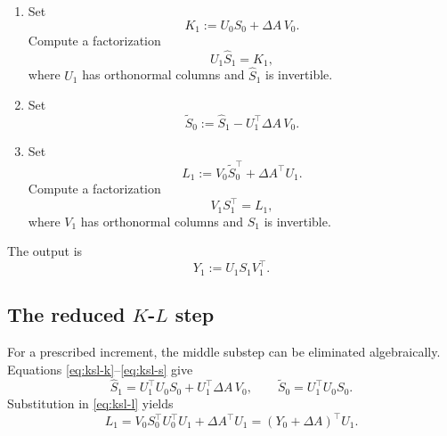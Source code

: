 \documentclass[]{article}
\numberwithin{equation}{section}
\theoremstyle{plain}
\theoremstyle{remark}
\numberwithin{algorithm}{section}
\begin{document}
\begin{enumerate}
\item Set
\begin{equation}\label{eq:ksl-k}
 K_1:=U_0S_0+\Delta A\,V_0.
\end{equation}
Compute a factorization
\begin{equation}\label{eq:ksl-k-factor}
 U_1\widehat S_1=K_1,
\end{equation}
where \(U_1\) has orthonormal columns and \(\widehat S_1\) is invertible.

\item Set
\begin{equation}\label{eq:ksl-s}
 \widetilde S_0:=\widehat S_1-U_1^\top\Delta A\,V_0.
\end{equation}

\item Set
\begin{equation}\label{eq:ksl-l}
 L_1:=V_0\widetilde S_0^\top+\Delta A^\top U_1.
\end{equation}
Compute a factorization
\begin{equation}\label{eq:ksl-l-factor}
 V_1S_1^\top=L_1,
\end{equation}
where \(V_1\) has orthonormal columns and \(S_1\) is invertible.
\end{enumerate}
The output is
\begin{equation}\label{eq:ksl-output}
 Y_1:=U_1S_1V_1^\top.
\end{equation}

\subsection{The reduced \texorpdfstring{\(K\)-\(L\)}{K-L} step}
\label{sec:two-factorizations}

For a prescribed increment, the middle substep can be eliminated
algebraically.  Equations \eqref{eq:ksl-k}--\eqref{eq:ksl-s} give
\begin{equation}\label{eq:ksl-s-simplified}
 \widehat S_1=U_1^\top U_0S_0+U_1^\top\Delta A\,V_0,
 \qquad \widetilde S_0=U_1^\top U_0S_0.
\end{equation}
Substitution in \eqref{eq:ksl-l} yields
\begin{equation}\label{eq:ksl-l-simplified}
 L_1=V_0S_0^\top U_0^\top U_1+\Delta A^\top U_1
     =(Y_0+\Delta A)^\top U_1.
\end{equation}
\end{document}
